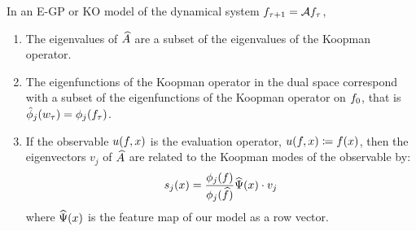 \begin{theorem}\label{thm:DualApproxModes}
	In an E-GP or KO model of the dynamical system $ f_{\tau+1} = \mathcal{A} f_{\tau}$,
	\begin{enumerate}
		\item The eigenvalues of $\widehat{A}$ are a subset of the eigenvalues of the Koopman operator.
		\item The eigenfunctions of the Koopman operator in the dual space correspond with a subset of the eigenfunctions of the Koopman operator on $f_0$, that is $\hat\phi_j(w_{\tau}) = \phi_j(f_{\tau})$.
		\item If the observable $u(f,x)$ is the evaluation operator, $u(f,x) \coloneqq f(x)$, then the eigenvectors $v_j$ of $\widehat{A}$ are related to the Koopman modes of the observable by:
		\begin{align}
			s_j (x) = \frac{\phi_j(f)}{\phi_j(\widehat{f})} \widehat{\Psi}(x) \cdot v_j
		\end{align}
		where $\widehat{\Psi}(x)$ is the feature map of our model as a row vector.
	\end{enumerate} 
\end{theorem}
